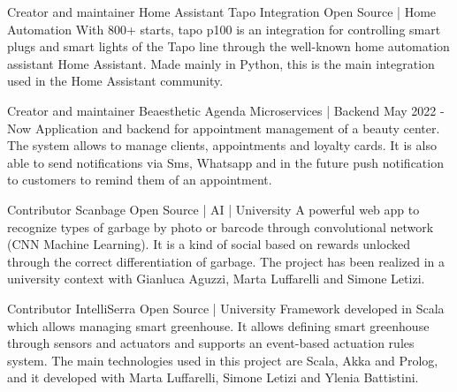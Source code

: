 


\begin{cventries}


\cventry
{Creator and maintainer} %
{Home Assistant Tapo Integration} %
{Open Source | Home Automation}
{}
{ %
With 800+ starts, tapo p100 is an integration for controlling smart plugs and smart lights of the Tapo line through the well-known home automation assistant Home Assistant. Made mainly in Python, this is the main integration used in the Home Assistant community.
}


\cventry
{Creator and maintainer} %
{Beaesthetic Agenda} %
{Microservices | Backend}
{May 2022 - Now}
{ %
Application and backend for appointment management of a beauty center. The system allows to manage clients, appointments and loyalty cards. It is also able to send notifications via Sms, Whatsapp and in the future push notification to customers to remind them of an appointment.
}


\cventry
{Contributor} %
{Scanbage} %
{Open Source | AI | University}
{}
{ %
A powerful web app to recognize types of garbage by photo or barcode through convolutional network (CNN Machine Learning). It is a kind of social based on rewards unlocked through the correct differentiation of garbage. The project has been realized in a university context with Gianluca Aguzzi, Marta Luffarelli and Simone Letizi.
}



\cventry
{Contributor} %
{IntelliSerra} %
{Open Source | University}
{}
{ %
Framework developed in Scala which allows managing smart greenhouse. It allows defining smart greenhouse through sensors and actuators and supports an event-based actuation rules system. The main technologies used in this project are Scala, Akka and Prolog, and it developed with Marta Luffarelli, Simone Letizi and Ylenia Battistini.
}


\end{cventries}
